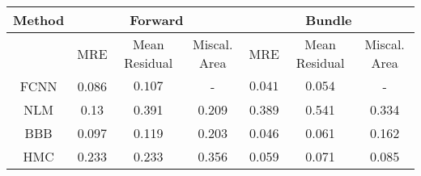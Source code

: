\documentclass[convert={outext=.png}]{standalone}
\begin{document}
\centering
\label{tab:experimental_results}



\begin{tabular}{c c c c c c c}
\hline
\hline
Method &  \multicolumn{3}{c}{Forward} & \multicolumn{3}{c}{Bundle} \\ \hline
 & MRE & Mean Residual & Miscal. Area & MRE & Mean Residual & Miscal. Area\\
 FCNN & 0.086 & $\mathbf{0.107}$ & - & $\mathbf{0.041}$ & $\mathbf{0.054}$ & - \\
 \hline
 NLM & 0.13 & 0.391 & 0.209 & 0.389 & 0.541 & 0.334 \\
 BBB & 0.097 & 0.119 & 0.203 & 0.046 & 0.061 & 0.162 \\
 HMC & 0.233 & 0.233 & 0.356 & 0.059 & 0.071 & 0.085 \\
\hline
\hline
\end{tabular}
\end{document}

